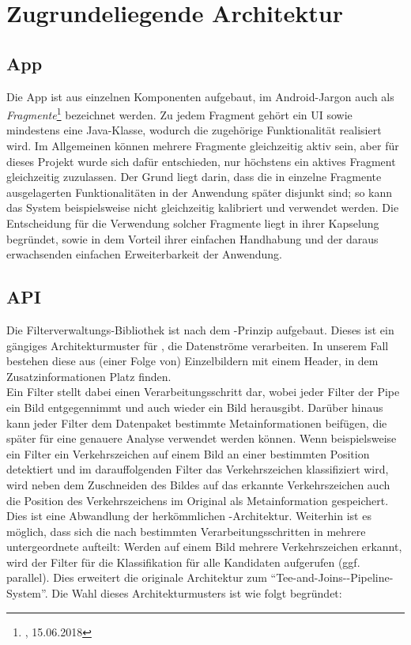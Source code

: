 \documentclass[12pt,a4paper,ngerman,enabledeprecatedfontcommands]{scrreprt}
\begin{document}
\section{Zugrundeliegende Architektur}

\subsection{App}
Die \gls{App} ist aus einzelnen Komponenten aufgebaut, im Android-Jargon auch als \textit{Fragmente}\footnote{, 15.06.2018} bezeichnet werden. Zu jedem Fragment gehört ein \gls{UI} sowie mindestens eine Java-Klasse, wodurch die zugehörige Funktionalität realisiert wird. Im Allgemeinen können mehrere Fragmente gleichzeitig aktiv sein, aber für dieses Projekt wurde sich dafür entschieden, nur höchstens ein aktives Fragment gleichzeitig zuzulassen. Der Grund liegt darin, dass die in einzelne Fragmente ausgelagerten Funktionalitäten in der Anwendung später disjunkt sind; so kann das \gls{System} beispielsweise nicht gleichzeitig kalibriert und verwendet werden. Die Entscheidung für die Verwendung solcher Fragmente liegt in ihrer Kapselung begründet, sowie in dem Vorteil ihrer einfachen Handhabung und der daraus erwachsenden einfachen Erweiterbarkeit der Anwendung.\\

\subsection{API}
Die \gls{Filterverwaltungs-Bibliothek} ist nach dem -Prinzip aufgebaut. Dieses ist ein gängiges Architekturmuster für , die Datenströme verarbeiten. In unserem Fall bestehen diese aus (einer Folge von) Einzelbildern mit einem Header, in dem Zusatzinformationen Platz finden.\\
Ein \gls{Filter} stellt dabei einen Verarbeitungsschritt dar, wobei jeder \gls{Filter} der \gls{Pipe} ein Bild entgegennimmt und auch wieder ein Bild herausgibt. Darüber hinaus kann jeder \gls{Filter} dem Datenpaket bestimmte Metainformationen beifügen, die später für eine genauere Analyse verwendet werden können. Wenn beispielsweise ein \gls{Filter} ein Verkehrszeichen auf einem Bild an einer bestimmten Position detektiert und im darauffolgenden \gls{Filter} das Verkehrszeichen klassifiziert wird, wird neben dem Zuschneiden des Bildes auf das erkannte Verkehrszeichen auch die Position des Verkehrszeichens im Original als Metainformation gespeichert. Dies ist eine Abwandlung der herkömmlichen -Architektur.
Weiterhin ist es möglich, dass sich die  nach bestimmten Verarbeitungsschritten in mehrere untergeordnete  aufteilt: Werden auf einem Bild mehrere Verkehrszeichen erkannt, wird der \gls{Filter} für die \gls{Klassifikation}  für alle Kandidaten aufgerufen (ggf. parallel). Dies erweitert die originale Architektur zum “Tee-and-Joins--Pipeline-System”.
Die Wahl dieses Architekturmusters ist wie folgt begründet:
\end{document}
